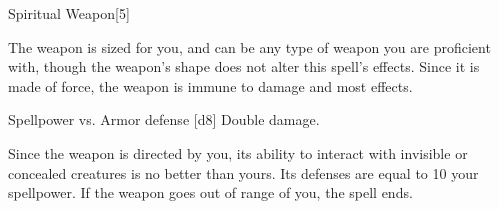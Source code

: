 \begin{spellfooter}
\begin{spellsection}{Spiritual Weapon}[5]
\begin{spellcontent}
\begin{spelleffects}
            The weapon is sized for you, and can be any type of weapon you are proficient with, though the weapon's shape does not alter this spell's effects. Since it is made of force, the weapon is immune to damage and most effects.
            \spelldur \durlong \dismissable
        \end{spelleffects}
    \end{spellcontent}
    \begin{spellsubcontent}
        \begin{spelltargetinginfo}
        \end{spelltargetinginfo}
        \begin{spelleffects}
            \begin{spellattack}{Spellpower vs. Armor defense}
                \spellsuccess {}[d8]
                \spellcritical Double damage.
            \end{spellattack}
        \end{spelleffects}
    \end{spellsubcontent}
    \begin{spellfooter}
        \spellnotes Since the weapon is directed by you, its ability to interact with invisible or concealed creatures is no better than yours. Its defenses are equal to 10 \add your spellpower. If the weapon goes out of range of you, the spell ends.
        \miscastexplode
    \end{spellfooter}
\end{spellsection}


\end{spellfooter}

